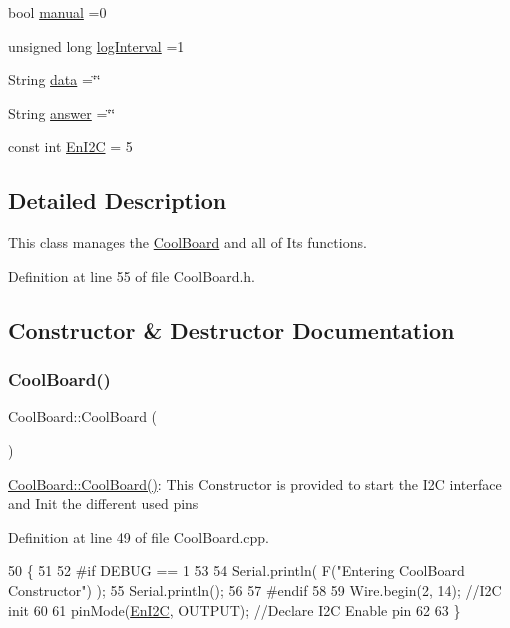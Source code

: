 \begin{DoxyCompactItemize}
\item 
bool \hyperlink{class_cool_board_a7c8e505a5804b109e112d5a03df6ea2b}{manual} =0
\item 
unsigned long \hyperlink{class_cool_board_a84bc94413b64973e4aba8c467c97006c}{log\+Interval} =1
\item 
String \hyperlink{class_cool_board_a427fb753dd8575bdf821c70a5c63d695}{data} =\char`\"{}\char`\"{}
\item 
String \hyperlink{class_cool_board_a7b835fafd449e5282f7f91d787a2dc15}{answer} =\char`\"{}\char`\"{}
\item 
const int \hyperlink{class_cool_board_af1fe1376fc66f93dee80b327ca695377}{En\+I2C} = 5
\end{DoxyCompactItemize}


\subsection{Detailed Description}
This class manages the \hyperlink{class_cool_board}{Cool\+Board} and all of Its functions. 

Definition at line 55 of file Cool\+Board.\+h.



\subsection{Constructor \& Destructor Documentation}
\mbox{\label{class_cool_board_a8b88fd781e22e93025dd63474113b7e4}} 
\subsubsection{\texorpdfstring{Cool\+Board()}{CoolBoard()}}
{\footnotesize\ttfamily Cool\+Board\+::\+Cool\+Board (\begin{DoxyParamCaption}{ }\end{DoxyParamCaption})}

\hyperlink{class_cool_board_a8b88fd781e22e93025dd63474113b7e4}{Cool\+Board\+::\+Cool\+Board()}\+: This Constructor is provided to start the I2C interface and Init the different used pins 

Definition at line 49 of file Cool\+Board.\+cpp.


\begin{DoxyCode}
50 \{
51 
52 \textcolor{preprocessor}{#if DEBUG == 1}
53 
54     Serial.println( F(\textcolor{stringliteral}{"Entering CoolBoard Constructor"}) );
55     Serial.println();
56 
57 \textcolor{preprocessor}{#endif}
58     
59     Wire.begin(2, 14);                       \textcolor{comment}{//I2C init }
60 
61     pinMode(\hyperlink{class_cool_board_af1fe1376fc66f93dee80b327ca695377}{EnI2C}, OUTPUT);           \textcolor{comment}{//Declare I2C Enable pin }
62 
63 \}
\end{DoxyCode}


